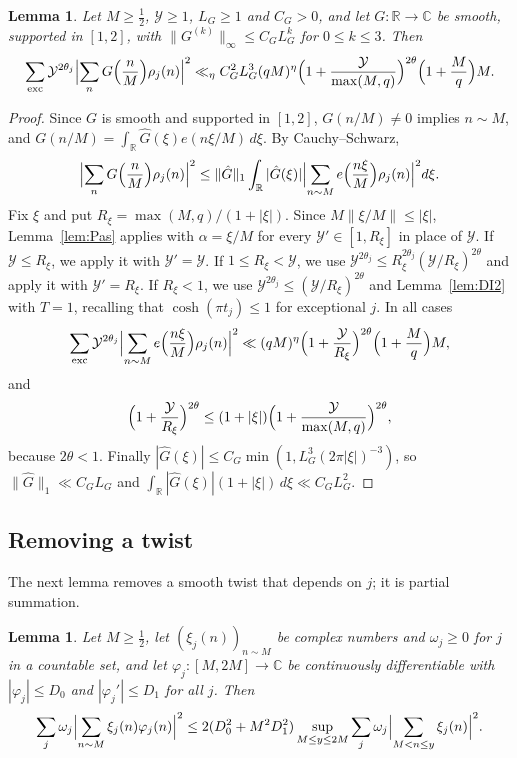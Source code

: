 \documentclass[11pt]{amsart}
\newtheorem{lemma}[theorem]{Lemma}
\theoremstyle{remark}
\theoremstyle{definition}
\numberwithin{equation}{section}
\newcommand{\R}{\mathbb{R}}
\newcommand{\C}{\mathbb{C}}
\newcommand{\exc}{\mathrm{exc}}
\begin{document}
\begin{lemma}\label{lem:smooth}
Let $M\ge\frac12$, $\mathcal Y\ge1$, $L_G\ge1$ and $C_G>0$, and let $G:\R\to\C$ be smooth, supported in $[1,2]$, with $\|G^{(k)}\|_\infty\le C_GL_G^k$ for $0\le k\le3$. Then
\[
\sum_{\exc}\mathcal Y^{2\theta_j}\Bigl|\sum_nG\Bigl(\frac nM\Bigr)\rho_j(n)\Bigr|^2\ll_\eta C_G^2L_G^3(qM)^\eta\Bigl(1+\frac{\mathcal Y}{\max(M,q)}\Bigr)^{2\theta}\Bigl(1+\frac Mq\Bigr)M.
\]
\end{lemma}

\begin{proof}
Since $G$ is smooth and supported in $[1,2]$, $G(n/M)\ne0$ implies $n\sim M$, and $G(n/M)=\int_\R\hat G(\xi)e(n\xi/M)\,d\xi$. By Cauchy--Schwarz,
\[
\Bigl|\sum_nG\Bigl(\frac nM\Bigr)\rho_j(n)\Bigr|^2\le\|\hat G\|_1\int_\R|\hat G(\xi)|\Bigl|\sum_{n\sim M}e\Bigl(\frac{n\xi}M\Bigr)\rho_j(n)\Bigr|^2d\xi.
\]
Fix $\xi$ and put $R_\xi=\max(M,q)/(1+|\xi|)$. Since $M\|\xi/M\|\le|\xi|$, Lemma~\ref{lem:Pas} applies with $\alpha=\xi/M$ for every $\mathcal Y'\in[1,R_\xi]$ in place of $\mathcal Y$. If $\mathcal Y\le R_\xi$, we apply it with $\mathcal Y'=\mathcal Y$. If $1\le R_\xi<\mathcal Y$, we use $\mathcal Y^{2\theta_j}\le R_\xi^{2\theta_j}(\mathcal Y/R_\xi)^{2\theta}$ and apply it with $\mathcal Y'=R_\xi$. If $R_\xi<1$, we use $\mathcal Y^{2\theta_j}\le(\mathcal Y/R_\xi)^{2\theta}$ and Lemma~\ref{lem:DI2} with $T=1$, recalling that $\cosh(\pi t_j)\le1$ for exceptional $j$. In all cases
\[
\sum_{\exc}\mathcal Y^{2\theta_j}\Bigl|\sum_{n\sim M}e\Bigl(\frac{n\xi}M\Bigr)\rho_j(n)\Bigr|^2\ll(qM)^\eta\Bigl(1+\frac{\mathcal Y}{R_\xi}\Bigr)^{2\theta}\Bigl(1+\frac Mq\Bigr)M,
\]
and
\[
\Bigl(1+\frac{\mathcal Y}{R_\xi}\Bigr)^{2\theta}\le(1+|\xi|)\Bigl(1+\frac{\mathcal Y}{\max(M,q)}\Bigr)^{2\theta},
\]
because $2\theta<1$. Finally $|\hat G(\xi)|\le C_G\min(1,L_G^3(2\pi|\xi|)^{-3})$, so $\|\hat G\|_1\ll C_GL_G$ and $\int_\R|\hat G(\xi)|(1+|\xi|)\,d\xi\ll C_GL_G^2$.
\end{proof}

\subsection{Removing a twist}
The next lemma removes a smooth twist that depends on $j$; it is partial summation.

\begin{lemma}\label{lem:twist}
Let $M\ge\frac12$, let $(\xi_j(n))_{n\sim M}$ be complex numbers and $\omega_j\ge0$ for $j$ in a countable set, and let $\varphi_j:[M,2M]\to\C$ be continuously differentiable with $|\varphi_j|\le D_0$ and $|\varphi_j'|\le D_1$ for all $j$. Then
\[
\sum_j\omega_j\Bigl|\sum_{n\sim M}\xi_j(n)\varphi_j(n)\Bigr|^2\le2(D_0^2+M^2D_1^2)\sup_{M\le y\le2M}\sum_j\omega_j\Bigl|\sum_{M<n\le y}\xi_j(n)\Bigr|^2.
\]
\end{lemma}
\end{document}
